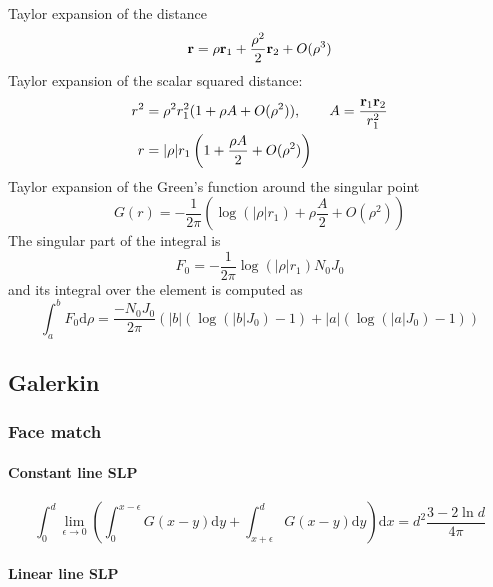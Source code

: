 \documentclass[a4paper,11pt]{article}
\newcommand{\td}{\mathrm{d}}
\begin{document}
Taylor expansion of the distance
%
\begin{equation}
	{\bf r} = \rho {\bf r}_1 + \frac{\rho^2}{2} {\bf r}_2 + O(\rho^3)
\end{equation}
%
Taylor expansion of the scalar squared distance:
%
\begin{align}
	r^2 &= \rho^2 r_1^2 (1 + \rho A + O(\rho^2)), \qquad A = \frac{{\bf r}_1 {\bf r}_2}{r_1^2} \\
	r &= |\rho| r_1 \left(1 + \frac{\rho A}{2} + O(\rho^2)\right)
\end{align}
%
Taylor expansion of the Green's function around the singular point
%
\begin{equation}
	G(r) = -\frac{1}{2\pi} \left(
		\log (|\rho| r_1) + \rho \frac{A}{2} + O(\rho^2)
		\right)
\end{equation}
%
The singular part of the integral is
%
\begin{equation}
	F_0 = -\frac{1}{2\pi} \log \left(|\rho| r_1\right) N_0 J_0
\end{equation}
%
and its integral over the element is computed as
%
\begin{equation}
	\int_{a}^b F_0 \td\rho
	= \frac{-N_0 J_0}{2\pi} \left(|b|(\log(|b| J_0) - 1) + |a|(\log(|a| J_0) - 1) \right)
\end{equation}



\subsection{Galerkin}

\subsubsection{Face match}

\paragraph{Constant line SLP}

\begin{equation}
\int_{0}^{d}
\lim_{\epsilon \to 0}
\left(
\int_{0}^{x-\epsilon} G(x-y) \td y
+
\int_{x+\epsilon}^{d} G(x-y) \td y
\right)
\td x
=
d^2\frac{3-2\ln d}{4\pi}
\end{equation}

\paragraph{Linear line SLP}
\end{document}
